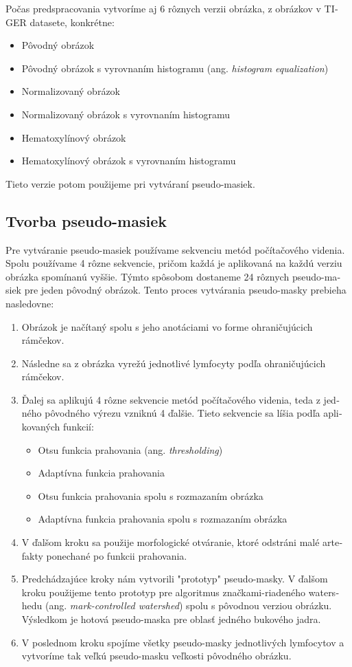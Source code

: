 \begin{otherlanguage}{slovak}
Počas predspracovania vytvoríme aj 6 rôznych verzii obrázka, z obrázkov v TIGER datasete, konkrétne:

\begin{itemize}
    \item Pôvodný obrázok
    \item Pôvodný obrázok s vyrovnaním histogramu (ang. \textit{histogram equalization})
    \item Normalizovaný obrázok
    \item Normalizovaný obrázok s vyrovnaním histogramu
    \item Hematoxylínový obrázok
    \item Hematoxylínový obrázok s vyrovnaním histogramu
\end{itemize}

Tieto verzie potom použijeme pri vytváraní pseudo-masiek.

\subsection{Tvorba pseudo-masiek}
Pre vytváranie pseudo-masiek používame sekvenciu metód počítačového videnia. Spolu používame 4 rôzne sekvencie, pričom každá je aplikovaná na každú verziu obrázka spomínanú vyššie. Týmto spôsobom dostaneme 24 rôznych pseudo-masiek pre jeden pôvodný obrázok. Tento proces vytvárania pseudo-masky prebieha nasledovne:

\begin{enumerate}
    \item Obrázok je načítaný spolu s jeho anotáciami vo forme ohraničujúcich rámčekov.
    \item Následne sa z obrázka vyrežú jednotlivé lymfocyty podľa ohraničujúcich rámčekov.
    \item Ďalej sa aplikujú 4 rôzne sekvencie metód počítačového videnia, teda z jedného pôvodného výrezu vzniknú 4 ďalšie. Tieto sekvencie sa líšia podľa aplikovaných funkcií:
    \begin{itemize}
        \item Otsu funkcia prahovania (ang. \textit{thresholding})
        \item Adaptívna funkcia prahovania
        \item Otsu funkcia prahovania spolu s rozmazaním obrázka
        \item Adaptívna funkcia prahovania spolu s rozmazaním obrázka
    \end{itemize}
    \item V ďalšom kroku sa použije morfologické otváranie, ktoré odstráni malé artefakty ponechané po funkcii prahovania.
    \item Predchádzajúce kroky nám vytvorili "prototyp" pseudo-masky. V ďalšom kroku použijeme tento prototyp pre algoritmus značkami-riadeného watershedu (ang. \textit{mark-controlled watershed}) spolu s pôvodnou verziou obrázku. Výsledkom je hotová pseudo-maska pre oblasť jedného bukového jadra.
    \item V poslednom kroku spojíme všetky pseudo-masky jednotlivých lymfocytov a vytvoríme tak veľkú pseudo-masku veľkosti pôvodného obrázku.
\end{enumerate}


\end{otherlanguage}
